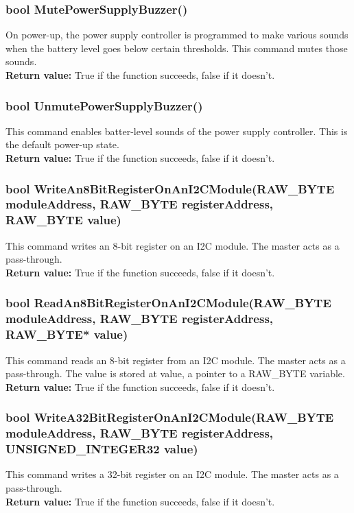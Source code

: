 \documentclass{book}
\begin{document}
\subsubsection{bool MutePowerSupplyBuzzer()}
On power-up, the power supply controller is programmed to make various sounds when the battery level goes below certain thresholds. This command mutes those sounds.\\
\textbf{Return value: }True if the function succeeds, false if it doesn't.\\ 

\subsubsection{bool UnmutePowerSupplyBuzzer()}
This command enables batter-level sounds of the power supply controller. This is the default power-up state.\\
\textbf{Return value: }True if the function succeeds, false if it doesn't.\\ 

\subsubsection{bool WriteAn8BitRegisterOnAnI2CModule(RAW\_BYTE moduleAddress, RAW\_BYTE registerAddress, RAW\_BYTE value)}
This command writes an 8-bit register on an I2C module. The master acts as a pass-through.\\
\textbf{Return value: }True if the function succeeds, false if it doesn't.\\ 

\subsubsection{	bool ReadAn8BitRegisterOnAnI2CModule(RAW\_BYTE moduleAddress, RAW\_BYTE registerAddress, RAW\_BYTE* value)}
This command reads an 8-bit register from an I2C module. The master acts as a pass-through. The value is stored at value, a pointer to a RAW\_BYTE variable.\\
\textbf{Return value: }True if the function succeeds, false if it doesn't.\\ 

\subsubsection{bool WriteA32BitRegisterOnAnI2CModule(RAW\_BYTE moduleAddress, RAW\_BYTE registerAddress, UNSIGNED\_INTEGER32 value)}
This command writes a 32-bit register on an I2C module. The master acts as a pass-through.\\
\textbf{Return value: }True if the function succeeds, false if it doesn't.\\ 
\end{document}
